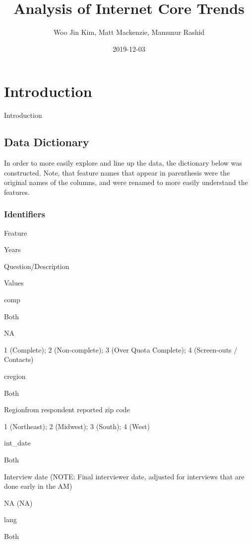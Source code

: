 \documentclass[]{book}
\title{Analysis of Internet Core Trends}
\author{Woo Jin Kim, Matt Mackenzie, Mamunur Rashid}
\date{2019-12-03}
\begin{document}
\maketitle

{
\hypersetup{linkcolor=black}
\setcounter{tocdepth}{1}
\tableofcontents
}
\chapter*{Introduction}\label{introduction}

Introduction

\section*{Data Dictionary}\label{data-dictionary}

In order to more easily explore and line up the data, the dictionary
below was constructed. Note, that feature names that appear in
parenthesis were the original names of the columns, and were renamed to
more easily understand the features.

\subsection*{Identifiers}\label{identifiers}

Feature

Years

Question/Description

Values

comp

Both

NA

1 (Complete); 2 (Non-complete); 3 (Over Quota Complete); 4 (Screen-outs
/ Contacts)

cregion

Both

Regionfrom respondent reported zip code

1 (Northeast); 2 (Midwest); 3 (South); 4 (West)

int\_date

Both

Interview date (NOTE: Final interviewer date, adjusted for interviews
that are done early in the AM)

NA (NA)

lang

Both
\end{document}

